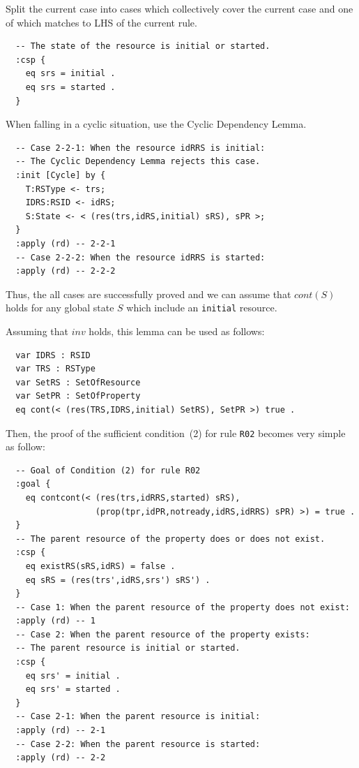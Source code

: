\documentclass[12pt]{report}
\begin{document}
 Split the current case into cases which
collectively cover the current case and one of which matches to LHS of
the current rule. 
\small
\begin{verbatim}
  -- The state of the resource is initial or started.
  :csp { 
    eq srs = initial .
    eq srs = started .
  }
\end{verbatim}
\normalsize
 When falling in a cyclic situation, use the
Cyclic Dependency Lemma. 
\small
\begin{verbatim}
  -- Case 2-2-1: When the resource idRRS is initial:
  -- The Cyclic Dependency Lemma rejects this case.
  :init [Cycle] by {
    T:RSType <- trs;
    IDRS:RSID <- idRS;
    S:State <- < (res(trs,idRS,initial) sRS), sPR >;
  }
  :apply (rd) -- 2-2-1
  -- Case 2-2-2: When the resource idRRS is started:
  :apply (rd) -- 2-2-2
\end{verbatim}
\normalsize
Thus, the all cases are successfully proved and we can assume that $cont(S)$
holds for any global state $S$ which include an {\tt initial}
resource.

Assuming that $inv$ holds, this lemma can be used as follows:
\small
\begin{verbatim}
  var IDRS : RSID 
  var TRS : RSType
  var SetRS : SetOfResource
  var SetPR : SetOfProperty
  eq cont(< (res(TRS,IDRS,initial) SetRS), SetPR >) true .
\end{verbatim}
\normalsize
Then, the proof of the sufficient condition~(2) for rule
{\tt R02} becomes very simple as follow:
\small
\begin{verbatim}
  -- Goal of Condition (2) for rule R02
  :goal {
    eq contcont(< (res(trs,idRRS,started) sRS),
                  (prop(tpr,idPR,notready,idRS,idRRS) sPR) >) = true .
  }
  -- The parent resource of the property does or does not exist.
  :csp {
    eq existRS(sRS,idRS) = false .
    eq sRS = (res(trs',idRS,srs') sRS') .
  }
  -- Case 1: When the parent resource of the property does not exist:
  :apply (rd) -- 1
  -- Case 2: When the parent resource of the property exists:
  -- The parent resource is initial or started.
  :csp {
    eq srs' = initial .
    eq srs' = started .
  }
  -- Case 2-1: When the parent resource is initial:
  :apply (rd) -- 2-1
  -- Case 2-2: When the parent resource is started:
  :apply (rd) -- 2-2
\end{verbatim}
\normalsize
\end{document}
